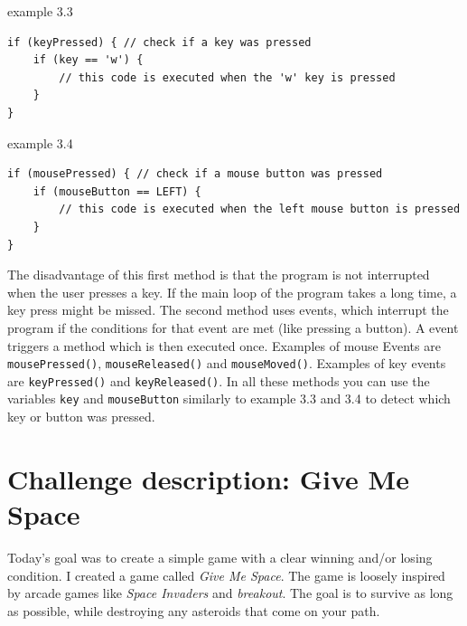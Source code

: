 \begin{codebox}{example 3.3}
    \begin{lstlisting}
if (keyPressed) { // check if a key was pressed
    if (key == 'w') {
        // this code is executed when the 'w' key is pressed
    } 
}
    \end{lstlisting}
\end{codebox}

\newpage

\begin{codebox}{example 3.4}
    \begin{lstlisting}
if (mousePressed) { // check if a mouse button was pressed
    if (mouseButton == LEFT) {
        // this code is executed when the left mouse button is pressed
    } 
}
    \end{lstlisting}
\end{codebox}

The disadvantage of this first method is that the program is not interrupted when the user presses a key. If the main loop of the program takes a long time, a key press might be missed. The second method uses events, which interrupt the program if the conditions for that event are met (like pressing a button). A event triggers a method which is then executed once. Examples of mouse Events are \texttt{mousePressed()}, \texttt{mouseReleased()} and \texttt{mouseMoved()}. Examples of key events are \texttt{keyPressed()} and \texttt{keyReleased()}. In all these methods you can use the variables \texttt{key} and \texttt{mouseButton} similarly to example 3.3 and 3.4 to detect which key or button was pressed.

\section{Challenge description: Give Me Space}

Today's goal was to create a simple game with a clear winning and/or losing condition. I created a game called \textit{Give Me Space}. The game is loosely inspired by arcade games like \textit{Space Invaders} and \textit{breakout}. The goal is to survive as long as possible, while destroying any asteroids that come on your path.

